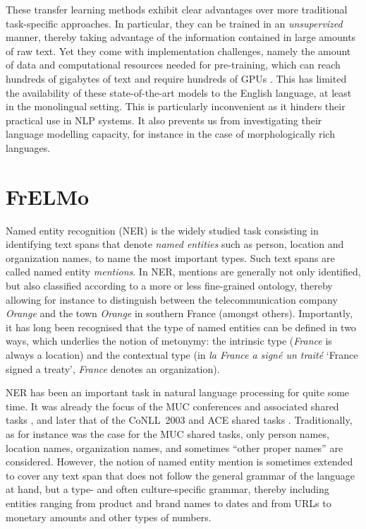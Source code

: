 These transfer learning methods exhibit clear advantages over more traditional task-specific approaches. In particular, they can be trained in an \emph{unsupervized} manner, thereby taking advantage of the information contained in large amounts of raw text.
Yet they come with implementation challenges, namely the amount of data and computational resources needed for pre-training, which can reach hundreds of gigabytes of text and require hundreds of GPUs \citep{yang-etal-2019-xlnet,liu-etal-2019-roberta}. This has limited the availability of these state-of-the-art models to the English language, at least in the monolingual setting. This is particularly inconvenient as it hinders their practical use in NLP systems. It also prevents us from investigating their language modelling capacity, for instance in the case of morphologically rich languages.

\section{FrELMo}
\label{sec:intro}

Named entity recognition (NER) is the widely studied task consisting in identifying text spans that denote \emph{named entities} such as person, location and organization names, to name the most important types. Such text spans are called named entity \emph{mentions}. In NER, mentions are generally not only identified, but also classified according to a more or less fine-grained ontology, thereby allowing for instance to distinguish between the telecommunication company \emph{Orange} and the town \emph{Orange} in southern France (amongst others). Importantly, it has long been recognised that the type of named entities can be defined in two ways, which underlies the notion of metonymy: the intrinsic type (\emph{France} is always a location) and the contextual type (in \emph{la France a signé un traité} `France signed a treaty', \emph{France} denotes an organization).


NER has been an important task in natural language processing for quite some time. It was already the focus of the MUC conferences and associated shared tasks
\cite{marsh-perzanowski-1998-muc}, and later that of the CoNLL~2003 and ACE shared tasks \cite{tjong-kim-sang-de-meulder-2003-introduction,doddington-etal-2004-automatic}. Traditionally, as for instance was the case for the MUC shared tasks, only person names, location names, organization names, and sometimes ``other proper names'' are considered. However, the notion of named entity mention is sometimes extended to cover any text span that does not follow the general grammar of the language at hand, but a type- and often culture-specific grammar, thereby including entities ranging from product and brand names to dates and from URLs to monetary amounts and other types of numbers.

